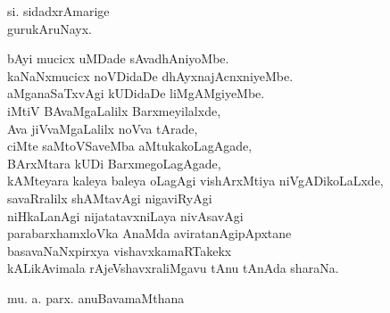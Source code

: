 \begin{entry}
\end{entry}

\begin{entry}
\gl{}
\begin{shl}
si. sidadxrAmarige\\
gurukAruNayx.
\end{shl}
\end{entry}

\begin{entry}
\begin{shl}
bAyi mucicx uMDade sAvadhAniyoMbe.\\
kaNaNxmucicx noVDidaDe dhAyxnajAcnxniyeMbe.\\
aMganaSaTxvAgi kUDidaDe liMgAMgiyeMbe.\\
iMtiV BAvaMgaLalilx Barxmeyilalxde,\\
Ava jiVvaMgaLalilx noVva tArade,\\
ciMte saMtoVSaveMba aMtukakoLagAgade,\\
BArxMtara kUDi BarxmegoLagAgade,\\
kAMteyara kaleya baleya oLagAgi vishArxMtiya niVgADikoLaLxde,\\
savaRralilx shAMtavAgi nigaviRyAgi\\
niHkaLanAgi nijatatavxniLaya nivAsavAgi\\
parabarxhamxloVka AnaMda aviratanAgipApxtane\\
basavaNaNxpirxya vishavxkamaRTakekx\\
kALikAvimala rAjeVshavxraliMgavu tAnu tAnAda sharaNa.
\end{shl}
\end{entry}

\begin{entry}
\end{entry}

\begin{entry}
\gl{}
\begin{shl}
mu. a. parx. anuBavamaMthana
\end{shl}
\end{entry}

